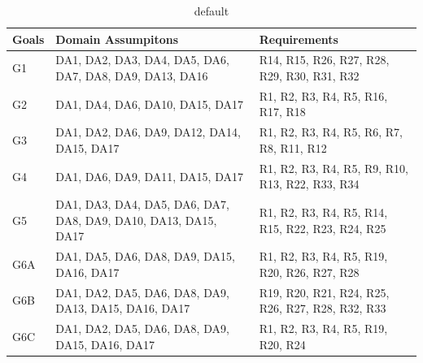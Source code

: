 \begin{table}[ht]

\begin{center}

\begin{tabular}{|p{2cm}|p{4cm}|p{4cm}|}
    
    \hline
   Goals & Domain Assumpitons & Requirements \\
    \hline
    G1 & DA1, DA2, DA3, DA4, DA5, DA6, DA7, DA8, DA9, DA13, DA16 & R14, R15, R26, R27, R28, R29, R30, R31, R32 \\ 
    \hline
    G2 & DA1, DA4, DA6, DA10, DA15, DA17 & R1, R2, R3, R4, R5, R16, R17, R18 \\
    \hline
    G3 & DA1, DA2, DA6, DA9, DA12, DA14, DA15, DA17 & R1, R2, R3, R4, R5, R6, R7, R8, R11, R12 \\
    \hline
    G4 & DA1, DA6, DA9, DA11, DA15, DA17 & R1, R2, R3, R4, R5, R9, R10, R13, R22, R33, R34 \\
    \hline
    G5 & DA1, DA3, DA4, DA5, DA6, DA7, DA8, DA9, DA10, DA13, DA15, DA17 & R1, R2, R3, R4, R5, R14, R15, R22, R23, R24, R25 \\
    \hline
    G6A & DA1, DA5, DA6, DA8, DA9, DA15, DA16, DA17 & R1, R2, R3, R4, R5, R19, R20, R26, R27, R28 \\
    \hline
    G6B & DA1, DA2, DA5, DA6, DA8, DA9, DA13, DA15, DA16, DA17 & R19, R20, R21, R24, R25, R26, R27, R28, R32, R33 \\
    \hline
    G6C & DA1, DA2, DA5, DA6, DA8, DA9, DA15, DA16, DA17 & R1, R2, R3, R4, R5, R19, R20, R24 \\
    \hline
\end{tabular}
\end{center}
\caption{default}
\end{table}



